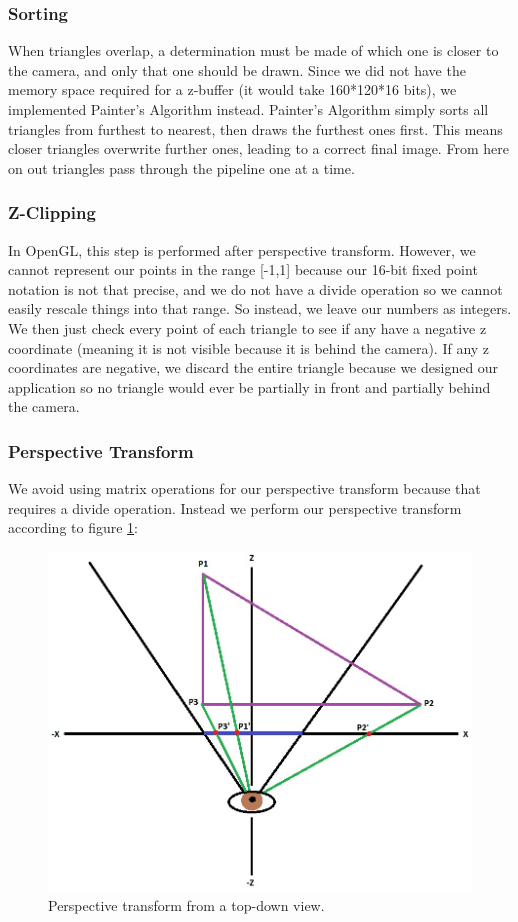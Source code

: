 \documentclass[onecolumn]{IEEEtran}
\begin{document}
\subsubsection{Sorting}
When triangles overlap, a determination must be made of which one is closer to the camera, and only that one should be drawn.  Since we did not have the memory space required for a z-buffer (it would take 160*120*16 bits), we implemented Painter's Algorithm instead.  Painter's Algorithm simply sorts all triangles from furthest to nearest, then draws the furthest ones first.  This means closer triangles overwrite further ones, leading to a correct final image.  From here on out triangles pass through the pipeline one at a time.

\subsubsection{Z-Clipping}
In OpenGL, this step is performed after perspective transform.   However, we cannot represent our points in the range [-1,1] because our 16-bit fixed point notation is not that precise, and we do not have a divide operation so we cannot easily rescale things into that range.  So instead, we leave our numbers as integers.  We then just check every point of each triangle to see if any have a negative z coordinate (meaning it is not visible because it is behind the camera).  If any z coordinates are negative, we discard the entire triangle because we designed our application so no triangle would ever be partially in front and partially behind the camera.

\subsubsection{Perspective Transform}
We avoid using matrix operations for our perspective transform because that requires a divide operation.  Instead we perform our perspective transform according to figure \ref{fig:perspectiveTransform}:

\begin{figure}[H]
	\centering
	\includegraphics[width=1.0\textwidth]{perspective.png}
	\caption{Perspective transform from a top-down view.}
	\label{fig:perspectiveTransform}
\end{figure}
\end{document}
